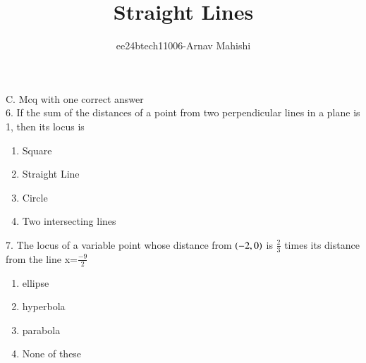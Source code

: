\documentclass[journal,12pt,twocolumn]{IEEEtran}
\theoremstyle{remark}
\begin{document}

\vspace{3cm}

\title{Straight Lines}
\author{ee24btech11006-Arnav Mahishi}
\maketitle
\newpage
\bigskip

\renewcommand{\thefigure}{\theenumi}
\renewcommand{\thetable}{\theenumi}
C. Mcq with one correct answer\\

$6$. If the sum of the distances of a point from two perpendicular lines in a plane is 1, then its locus is \hfill{}
\begin{enumerate}[label=(\alph*)]
    \item Square
    \item Straight Line
    \item Circle
    \item Two intersecting lines
\end{enumerate}

$7$. The locus of a variable point whose distance from $\left(-2,0\right)$ is 
$\frac{2}{3}$ times its distance from the line x=$\frac{-9}{2}$ \hfill{}
\begin{enumerate}[label=(\alph*)]
    \item ellipse
    \item hyperbola
    \item parabola
    \item None of these
\end{enumerate}
\end{document}
